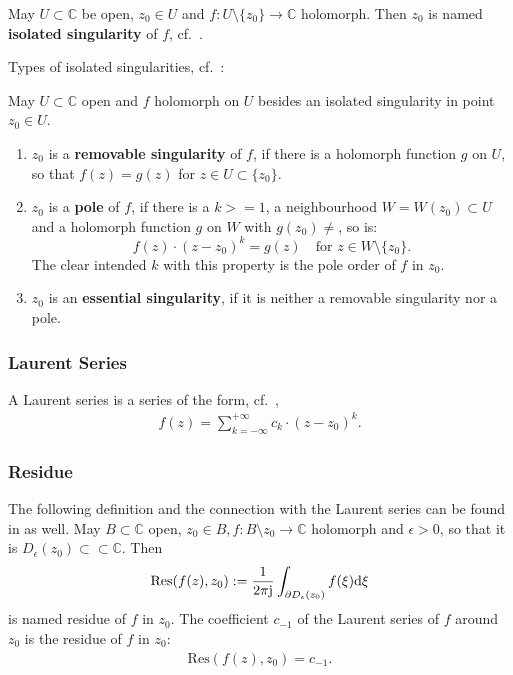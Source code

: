 \documentclass[11pt,a4paper,DIV=12]{scrartcl}
\begin{document}
May $U \subset \mathbb{C}$ be open, $z_0 \in U$ and $f : U \setminus \{z_0\} \rightarrow \mathbb{C}$ holomorph. Then $z_0$ is named \textbf{isolated singularity} of $f$, cf.~\cite{Fritzsche2019}.

Types of isolated singularities, cf.~\cite{Fritzsche2019}:

May $U \subset \mathbb{C}$ open and $f$ holomorph on $U$ besides an isolated singularity in point $z_0 \in U$.
\begin{enumerate}
	\item $z_0$ is a \textbf{removable singularity} of $f$, if there is a holomorph function $g$ on $U$, so that $f(z)=g(z)$ for $z \in U \subset \{z_0\}$.
	\item $z_0$ is a \textbf{pole} of $f$, if there is a $k >= 1$, a neighbourhood $W = W(z_0) \subset U$ and a holomorph function $g$ on $W$ with $g(z_0) \neq $, so is:
	\begin{equation}
		f(z)\cdot(z-z_0)^k=g(z)\quad \textrm{for }z \in W \setminus \{z_0\}. \nonumber
	\end{equation}
	The clear intended $k$ with this property is the pole order of $f$ in $z_0$.
	\item $z_0$ is an \textbf{essential singularity}, if it is neither a removable singularity nor a pole.
\end{enumerate}
\subsubsection{Laurent Series}
A Laurent series is a series of the form, cf.~\cite{Fritzsche2019},
\begin{align}
	f(z) = \sum_{k=-\infty}^{+\infty}c_k\cdot(z-z_0)^k.
\end{align}

\subsubsection{Residue}
The following definition and the connection with the Laurent series can be found in \cite{Fritzsche2019} as well.
May $B \subset \mathbb{C}$ open, $z_0 \in B, f: B \setminus z_0 \rightarrow \mathbb{C}$ holomorph and $\epsilon > 0$, so that it is $D_{\epsilon}(z_0)\subset\subset \mathbb{C}$. Then
\begin{align}
	\mathrm{Res}(f(z),z_0):=\frac{1}{2\pi\im}\int_{\partial D_{\epsilon}(z_0)}f(\xi)\mathrm{d}\xi
\end{align}
is named residue of $f$ in $z_0$.
The coefficient $c_{-1}$ of the Laurent series of $f$ around $z_0$ is the residue of $f$ in $z_0$:
\begin{align}
	\mathrm{Res}(f(z),z_0)=c_{-1}.
\end{align}
\end{document}
